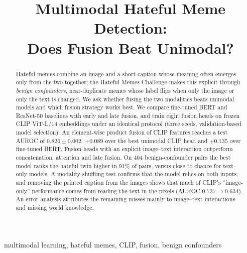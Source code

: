 \documentclass[conference]{IEEEtran}
\begin{document}
\title{Multimodal Hateful Meme Detection:\\ Does Fusion Beat Unimodal?}


\author{
}

\maketitle

\begin{abstract}
Hateful memes combine an image and a short caption whose meaning often emerges only from the two together; the
Hateful Memes Challenge makes this explicit through \emph{benign confounders}, near-duplicate memes whose label
flips when only the image or only the text is changed. We ask whether fusing the two modalities beats unimodal
models and which fusion strategy works best. We compare fine-tuned BERT and ResNet-50 baselines with early and late
fusion, and train eight fusion heads on frozen CLIP ViT-L/14 embeddings under an identical protocol (three seeds,
validation-based model selection). An element-wise product fusion of CLIP features reaches a test AUROC of
$0.826\pm0.002$, $+0.089$ over the best unimodal CLIP head and $+0.135$ over fine-tuned BERT. Fusion heads with an
explicit image--text interaction outperform concatenation, attention and late fusion. On 404 benign-confounder pairs
the best model ranks the hateful twin higher in 91\% of pairs, versus close to chance for text-only models. A
modality-shuffling test confirms that the model relies on both inputs, and removing the printed caption from the
images shows that much of CLIP's ``image-only'' performance comes from reading the text in the pixels (AUROC
$0.737\rightarrow0.634$). An error analysis attributes the remaining misses mainly to image--text interactions and
missing world knowledge.
\end{abstract}

\begin{IEEEkeywords}
multimodal learning, hateful memes, CLIP, fusion, benign confounders
\end{IEEEkeywords}

\end{document}
